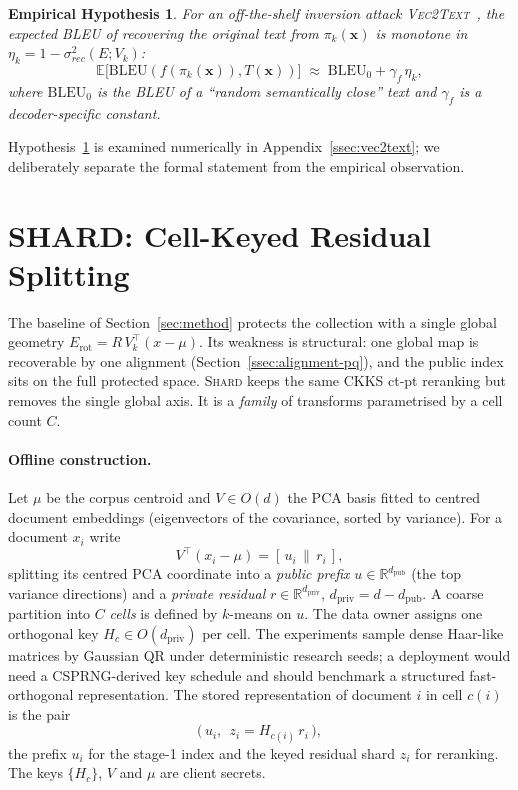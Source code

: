 \documentclass[11pt,a4paper]{article}
\newtheorem{hypothesis}{Empirical Hypothesis}
\begin{document}
\begin{hypothesis}\label{hyp:bleu}
For an off-the-shelf inversion attack \textsc{Vec2Text}~\cite{ref_vec2text},
the expected BLEU of recovering the original text from
$\pi_k(\mathbf{x})$ is monotone in
$\eta_k = 1 - \sigma_{rec}^{2}(E; V_k)$:
\[
\mathbb{E}\bigl[ \mathrm{BLEU}(f(\pi_k(\mathbf{x})), T(\mathbf{x})) \bigr]
\;\approx\; \mathrm{BLEU}_0 + \gamma_f \, \eta_k,
\]
where $\mathrm{BLEU}_0$ is the BLEU of a ``random semantically close''
text and $\gamma_f$ is a decoder-specific constant.
\end{hypothesis}

Hypothesis~\ref{hyp:bleu} is examined numerically in
Appendix~\ref{ssec:vec2text}; we deliberately separate the formal
statement from the empirical observation.

\section{SHARD: Cell-Keyed Residual Splitting}\label{sec:shard}

The baseline of Section~\ref{sec:method} protects the collection with a
single global geometry $E_{\mathrm{rot}} = R\,V_k^\top(x-\mu)$. Its
weakness is structural: one global map is recoverable by one alignment
(Section~\ref{ssec:alignment-pq}), and the public index sits on the full
protected space. \textsc{Shard} keeps the same CKKS ct-pt reranking but
removes the single global axis. It is a \emph{family} of transforms
parametrised by a cell count $C$.

\paragraph{Offline construction.} Let $\mu$ be the corpus centroid and
$V\in O(d)$ the PCA basis fitted to centred document embeddings (eigenvectors
of the covariance, sorted by variance). For a document $x_i$ write
\[
V^\top(x_i-\mu)=[\,u_i\,\|\,r_i\,],
\]
splitting its centred PCA coordinate into a
\emph{public prefix} $u\in\mathbb{R}^{d_{\mathrm{pub}}}$ (the top variance
directions) and a \emph{private residual} $r\in\mathbb{R}^{d_{\mathrm{priv}}}$,
$d_{\mathrm{priv}}=d-d_{\mathrm{pub}}$. A coarse partition into $C$
\emph{cells} is defined by $k$-means on $u$. The data owner assigns one
orthogonal key $H_c\in O(d_{\mathrm{priv}})$ per cell. The experiments sample
dense Haar-like matrices by Gaussian QR under deterministic research seeds;
a deployment would need a CSPRNG-derived key schedule and should benchmark a
structured fast-orthogonal representation. The stored
representation of document $i$ in cell $c(i)$ is the pair
\[
\big(\, u_i,\ \ z_i = H_{c(i)}\, r_i \,\big),
\]
the prefix $u_i$ for the stage-1 index and the keyed residual shard $z_i$
for reranking. The keys $\{H_c\}$, $V$ and $\mu$ are client secrets.
\end{document}
